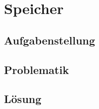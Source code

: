 \section{Speicher}

\subsection{Aufgabenstellung}
\lipsum[2]

\subsection{Problematik}
\lipsum[3]

\subsection{Lösung}
\lipsum[4-5]
